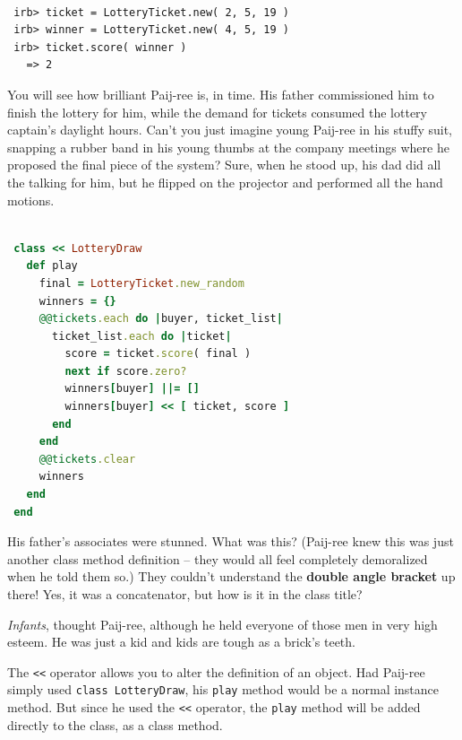 \documentclass[10pt,twoside]{report}
\begin{document}
\begin{lstlisting}

 irb> ticket = LotteryTicket.new( 2, 5, 19 )
 irb> winner = LotteryTicket.new( 4, 5, 19 )
 irb> ticket.score( winner )
   => 2

\end{lstlisting}


You will see how brilliant Paij-ree is, in time.  His father
commissioned him to finish the lottery for him, while the demand for
tickets consumed the lottery captain's daylight hours.  Can't you just
imagine young Paij-ree in his stuffy suit, snapping a rubber band in
his young thumbs at the company meetings where he proposed the final
piece of the system?  Sure, when he stood up, his dad did all the
talking for him, but he flipped on the projector and performed all the
hand motions.


\begin{lstlisting}[basicstyle=\ttfamily\color{basiccolor},
    commentstyle = \ttfamily\color{commentcolor},
    keywordstyle=\ttfamily\color{keywordscolor},
    stringstyle=\color{stringcolor},
    language=Ruby,
    basicstyle=\small\ttfamily,
    showstringspaces=false,
  ]

 class << LotteryDraw
   def play
     final = LotteryTicket.new_random
     winners = {}
     @@tickets.each do |buyer, ticket_list|
       ticket_list.each do |ticket|
         score = ticket.score( final )
         next if score.zero?
         winners[buyer] ||= []
         winners[buyer] << [ ticket, score ]
       end
     end
     @@tickets.clear
     winners
   end
 end

\end{lstlisting}


His father's associates were stunned.  What was this?  (Paij-ree knew
this was just another class method definition -- they would all feel
completely demoralized when he told them so.)  They couldn't
understand the {\bf double angle bracket} up there!  Yes, it was a
concatenator, but how is it in the class title?

{\em Infants}, thought Paij-ree, although he held everyone of those
men in very high esteem.  He was just a kid and kids are tough as a
brick's teeth.

The \lstinline[breaklines=true]|<<| operator allows you to alter the
definition of an object. Had Paij-ree simply used
\lstinline[breaklines=true]|class LotteryDraw|, his
\lstinline[breaklines=true]|play| method would be a normal instance
method.  But since he used the \lstinline[breaklines=true]|<<|
operator, the \lstinline[breaklines=true]|play| method will be added
directly to the class, as a class method.
\end{document}
